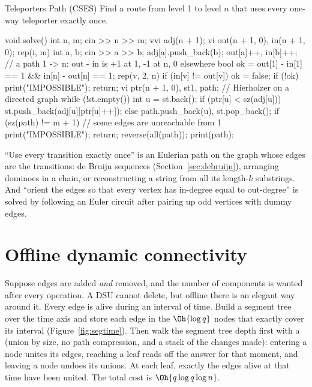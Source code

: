 \begin{problem}{Teleporters Path (CSES)}
Find a route from level 1 to level $n$ that uses every one-way teleporter exactly once.
\end{problem}

\begin{code}
void solve() {
    int n, m;
    cin >> n >> m;
    vvi adj(n + 1);
    vi out(n + 1, 0), in(n + 1, 0);
    rep(i, m) {
        int a, b;
        cin >> a >> b;
        adj[a].push_back(b);
        out[a]++, in[b]++;
    }
    // a path 1 -> n: out - in is +1 at 1, -1 at n, 0 elsewhere
    bool ok = out[1] - in[1] == 1 && in[n] - out[n] == 1;
    rep(v, 2, n) if (in[v] != out[v]) ok = false;
    if (!ok) {
        print("IMPOSSIBLE");
        return;
    }
    vi ptr(n + 1, 0), st{1}, path;  // Hierholzer on a directed graph
    while (!st.empty()) {
        int u = st.back();
        if (ptr[u] < sz(adj[u])) st.push_back(adj[u][ptr[u]++]);
        else path.push_back(u), st.pop_back();
    }
    if (sz(path) != m + 1) {  // some edges are unreachable from 1
        print("IMPOSSIBLE");
        return;
    }
    reverse(all(path));
    print(path);
}
\end{code}


\begin{trick}
``Use every transition exactly once'' is an Eulerian path on the graph whose edges are the transitions: de Bruijn sequences
(Section~\ref{sec:debruijn}), arranging dominoes in a chain, or reconstructing a string from all its length-$k$ substrings. And
``orient the edges so that every vertex has in-degree equal to out-degree'' is solved by following an Euler circuit after pairing
up odd vertices with dummy edges.
\end{trick}

\section[Offline dynamic connectivity]{Offline dynamic connectivity \hfill \ioi}\label{sec:offline-dyncon}

Suppose edges are added \emph{and} removed, and the number of components is wanted after every operation. A DSU cannot delete,
but offline there is an elegant way around it. Every edge is alive during an interval of time. Build a segment tree over the time
axis and store each edge in the $\Oh{\log q}$ nodes that exactly cover its interval (Figure~\ref{fig:segtime}). Then walk the
segment tree depth first with a  (union by size, no path compression, and a stack of the changes made):
entering a node unites its edges, reaching a leaf reads off the answer for that moment, and leaving a node undoes its unions. At
each leaf, exactly the edges alive at that time have been united. The total cost is $\Oh{q \log q \log n}$.

